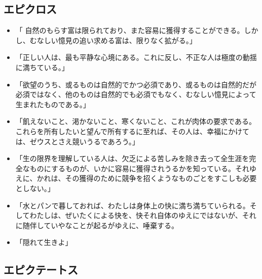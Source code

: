 \documentclass[uplatex,dvipdfmx]{jsarticle} \usepackage{mystyle}%
\begin{document}
\subsection{エピクロス }

    \begin{itemize}
    \item 「 自然のもらす富は限られており、また容易に獲得することができる。しかし、むなしい憶見の追い求める富は、限りなく拡がる。」 %

    \item 「正しい人は、最も平静な心境にある。これに反し、不正な人は極度の動揺に満ちている。」

    \item 「欲望のうち、或るものは自然的でかつ必須であり、或るものは自然的だが必須ではなく、他のものは自然的でも必須でもなく、むなしい憶見によって生まれたものである。」


    \item 「飢えないこと、渇かないこと、寒くないこと、これが肉体の要求である。これらを所有したいと望んで所有するに至れば、その人は、幸福にかけては、ゼウスとさえ競いうるであろう。」

    \item 「生の限界を理解している人は、欠乏による苦しみを除き去って全生涯を完全なものにするものが、いかに容易に獲得されうるかを知っている。それゆえに、かれは、その獲得のために競争を招くようなものごとをすこしも必要としない。」

    \item 「水とパンで暮しておれば、わたしは身体上の快に満ち満ちていられる。そしてわたしは、ぜいたくによる快を、快それ自体のゆえにではないが、それに随伴していやなことが起るがゆえに、唾棄する。

    \item 「隠れて生きよ」
    \end{itemize}




\subsection*{エピクテートス}
\end{document}
